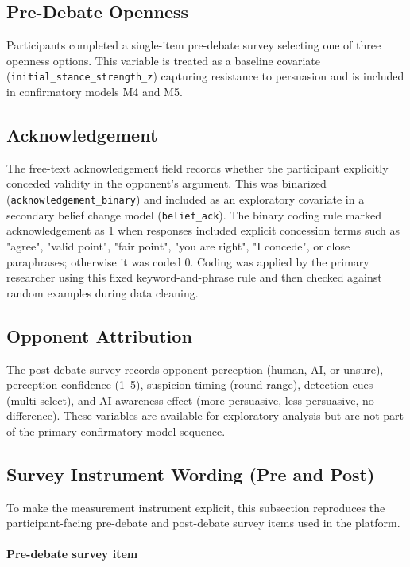 \subsection{Pre-Debate Openness}

Participants completed a single-item pre-debate survey selecting one of three
openness options. This variable is treated as a baseline covariate
(\texttt{initial\_stance\_strength\_z}) capturing resistance to persuasion and
is included in confirmatory models M4 and M5.

\subsection{Acknowledgement}

The free-text acknowledgement field records whether the participant explicitly
conceded validity in the opponent's argument. This was binarized
(\texttt{acknowledgement\_binary}) and included as an exploratory covariate in
a secondary belief change model (\texttt{belief\_ack}).
The binary coding rule marked acknowledgement as 1 when responses included explicit
concession terms such as "agree", "valid point", "fair point", "you are right",
"I concede", or close paraphrases; otherwise it was coded 0. Coding was applied by
the primary researcher using this fixed keyword-and-phrase rule and then checked
against random examples during data cleaning.

\subsection{Opponent Attribution}

The post-debate survey records opponent perception (human, AI, or unsure),
perception confidence (1--5), suspicion timing (round range), detection cues
(multi-select), and AI awareness effect (more persuasive, less persuasive, no
difference). These variables are available for exploratory analysis but are
not part of the primary confirmatory model sequence.

\subsection{Survey Instrument Wording (Pre and Post)}

To make the measurement instrument explicit, this subsection reproduces the
participant-facing pre-debate and post-debate survey items used in the platform.

\paragraph{Pre-debate survey item}

